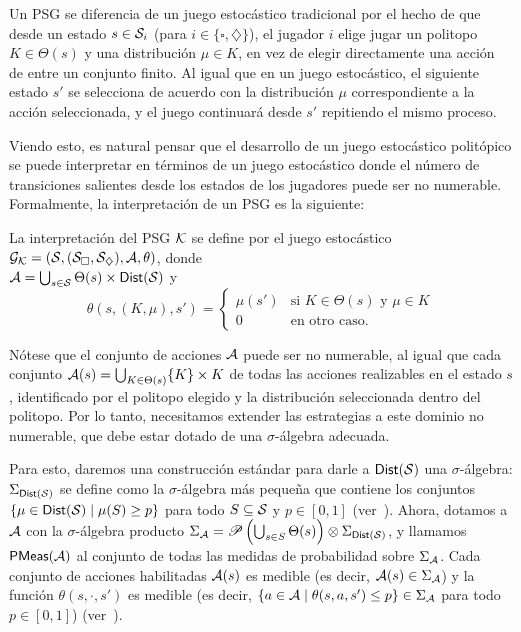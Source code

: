 Un PSG se diferencia de un juego estocástico tradicional por el hecho de que
desde un estado \( s \in \mathcal{S}_i \) (para \( i \in \{ \square, \diamondsuit \}
\)), el jugador \( i \) elige jugar un politopo \( K \in \Theta(s) \) y una
distribución \( \mu \in K \), en vez de elegir directamente una acción de entre
un conjunto finito. Al igual que en un juego estocástico, el siguiente estado
\( s' \) se selecciona de acuerdo con la distribución \( \mu \) correspondiente
a la acción seleccionada, y el juego continuará desde \( s' \) repitiendo el
mismo proceso.

Viendo esto, es natural pensar que el desarrollo de un juego estocástico
politópico se puede interpretar en términos de un juego estocástico donde el
número de transiciones salientes desde los estados de los jugadores puede ser
no numerable. Formalmente, la interpretación de un PSG es la siguiente:

\begin{definition}
	\label{def:interpret}
	La interpretación del PSG \( \mathcal{K} \) se define por el juego estocástico \( \mathcal{G}_{\mathcal{K}} = (\mathcal{S}, (\mathcal{S}_\square, \mathcal{S}_\diamondsuit), \mathcal{A}, \theta) \), donde \\ \(\mathcal{A} = \bigcup_{s \in \mathcal{S}} \Theta(s) \times \textsf{Dist}(\mathcal{S}) \) y
	\[
		\theta(s, (K, \mu), s') =
		\begin{cases}
			\mu(s') & \text{si } K \in \Theta(s) \text{ y } \mu \in K \\
			0 & \text{en otro caso}.
		\end{cases}
	\]
\end{definition}

Nótese que el conjunto de acciones \( \mathcal{A} \) puede ser no numerable, al igual
que cada conjunto \( \mathcal{A}(s) = \bigcup_{K \in \Theta(s)} \{K\} \times K \) de
todas las acciones realizables en el estado $s$, identificado por el politopo
elegido y la distribución seleccionada dentro del politopo. Por lo tanto,
necesitamos extender las estrategias a este dominio no numerable, que debe
estar dotado de una \( \sigma \)-álgebra adecuada.

Para esto, daremos una construcción estándar para darle a \( \textsf{Dist}(\mathcal{S})
\) una \( \sigma \)-álgebra: \( \Sigma_{\textsf{Dist}(\mathcal{S})} \) se define como
la \( \sigma \)-álgebra más pequeña que contiene los conjuntos \\ \( \{\mu \in
\textsf{Dist}(\mathcal{S}) \mid \mu(S) \geq p\} \) para todo \( S \subseteq \mathcal{S} \) y \(
p \in [0, 1] \) (ver~\cite{Giry82}). Ahora, dotamos a \( \mathcal{A} \) con la \(
\sigma \)-álgebra producto \( \Sigma_{\mathcal{A}} = \mathscr{P} \left(\bigcup_{s \in S}
\Theta(s)\right) \otimes \Sigma_{\textsf{Dist}(\mathcal{S})} \), y llamamos \( \mathsf{PMeas}(\mathcal{A}) \)
al conjunto de todas las medidas de probabilidad sobre \( \Sigma_{\mathcal{A}} \). Cada
conjunto de acciones habilitadas \( \mathcal{A}(s) \) es medible (es decir, \( \mathcal{A}(s)
\in \Sigma_{\mathcal{A}} \)) y la función \( \theta(s, \cdot, s') \) es medible (es
decir, \( \{a \in \mathcal{A} \mid \theta(s, a, s') \leq p\} \in \Sigma_{\mathcal{A}} \) para
todo \( p \in [0, 1] \)) (ver~\cite{Polytopal}).

